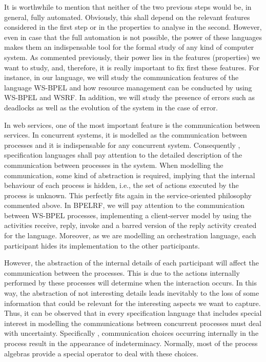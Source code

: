It is worthwhile to mention that neither of the two previous steps would be, in general, fully automated.
Obviously, this shall depend on the relevant features considered in the first
step or in the properties to analyse in the second. However, even in case that the full automation is not possible, 
the power of these languages makes them an indispensable tool for the formal study of any kind of computer system. 
As commented previously, their power lies in the features (properties) we want to study, and, therefore, it is really
important to fix first these features. For instance, in our language, we will study the communication features of the language 
WS-BPEL and how resource management can be conducted by using WS-BPEL and WSRF. In addition, we will study the presence of errors such as deadlocks
as well as the evolution of the system in the case of error. 

In web services, one of the most important feature is the communication between services. In concurrent systems,
it is modelled as the communication between processes and it is indispensable for any concurrent system.
Consequently , specification languages shall pay attention to the detailed description
of the communication between processes in the system. When modelling the communication, 
some kind of abstraction is required, implying that the internal behaviour of each
process is hidden, i.e., the set of actions executed by the process is unknown. This perfectly fits again in the service-oriented
philosophy commented above. In BPELRF, we will pay attention to the communication between WS-BPEL processes, implementing a client-server
model by using the activities receive, reply, invoke and a barred version of the reply activity created for the language. Moreover, as we are modelling
an orchestration language, each participant hides its implementation to the other participants.  

However, the abstraction of the internal details of each participant will affect 
the communication between the processes. This is due to the actions internally performed by these processes will determine when 
the interaction occurs. In this way, the abstraction of not interesting details 
leads inevitably to the loss of some information that could be
relevant for the interesting aspects we want to capture.
Thus, it can be observed that in every specification language 
that includes special interest in modelling the communications between concurrent processes must deal
with uncertainty. Specifically , communication choices
occurring internally in the process result in the appearance of indeterminacy. Normally, most of the process
algebras provide a special operator to deal with these choices.

